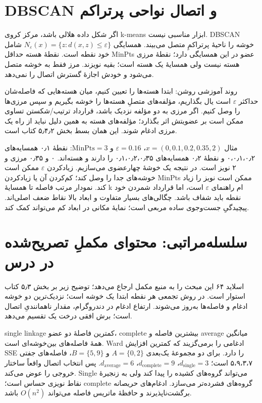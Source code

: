 \section{DBSCAN و اتصال نواحی پرتراکم}

اگر شکل داده هلالی باشد، مرکز کروی k-means ابزار مناسبی نیست. DBSCAN خوشه را ناحیهٔ پرتراکمِ متصل می‌بیند. همسایگی \(N_\varepsilon(x)=\{z:d(x,z)\le\varepsilon\}\) شامل خود نقطه است. نقطهٔ هسته حداقل MinPts عضو در این همسایگی دارد؛ نقطهٔ مرزی هسته نیست ولی همسایهٔ یک هسته است؛ بقیه نویزند. مرز فقط به خوشه متصل می‌شود و خودش اجازهٔ گسترش اتصال را نمی‌دهد.

روند آموزشی روشن: ابتدا هسته‌ها را تعیین کنیم، میان هسته‌هایی که فاصله‌شان حداکثر $\varepsilon$ است یال بگذاریم، مؤلفه‌های متصلِ هسته‌ها را خوشه بگیریم و سپس مرزی‌ها را وصل کنیم. اگر مرزی به دو مؤلفه نزدیک باشد، قرارداد ترتیب/شکستن تساوی ممکن است بر عضویتش اثر بگذارد؛ مؤلفه‌های هسته به همین دلیل نباید از راه یک مرزی ادغام شوند. این همان بسط بخش ۵٫۴٫۲ کتاب است.

مثال \(x=(0,0.1,0.2,0.35,2)\)، $\varepsilon=0.16$ و $\mathrm{MinPts}=3$: نقطهٔ ۰٫۱ همسایه‌های ۰،۰٫۱،۰٫۲ و نقطهٔ ۰٫۲ همسایه‌های ۰٫۱،۰٫۲،۰٫۳۵ را دارند و هسته‌اند. ۰ و ۰٫۳۵ مرزی و ۲ نویز است. در نتیجه یک خوشهٔ چهارعضوی می‌سازیم. زیادکردن $\varepsilon$ ممکن است خوشه‌های جدا را وصل کند؛ کم‌کردن آن یا زیادکردن MinPts ممکن است نویز را زیاد کند. نمودار مرتب فاصله تا همسایهٔ k ام راهنمای $\varepsilon$ است، اما قرارداد شمردن خود نقطه باید شفاف باشد. چگالی‌های بسیار متفاوت و ابعاد بالا نقاط ضعف اصلی‌اند. پیچیدگیِ جست‌وجوی ساده مربعی است؛ نمایهٔ مکانی در ابعاد کم می‌تواند کمک کند.

\section{سلسله‌مراتبی: محتوای مکملِ تصریح‌شده در درس}

اسلاید ۶۴ این مبحث را به منبع مکمل ارجاع می‌دهد؛ توضیح زیر بر بخش ۵٫۳ کتاب استوار است. در روش تجمعی هر نقطه ابتدا یک خوشه است؛ نزدیک‌ترین دو خوشه ادغام و فاصله‌ها به‌روز می‌شوند. ارتفاع ادغام در دندروگرام، مقدار ناهمانندیِ اتصال است؛ برش افقی درخت یک تقسیم می‌دهد.

single linkage کمترین فاصلهٔ دو عضو، complete بیشترین فاصله و average میانگین همهٔ فاصله‌های بین‌خوشه‌ای است. Ward ادغامی را برمی‌گزیند که کمترین افزایش SSE را دارد. برای دو مجموعهٔ یک‌بعدی $A=\{0,2\}$ و $B=\{5,9\}$، فاصله‌های جفتی ۵،۹،۳،۷ است؛ $d_{\mathrm{single}}=3$، $d_{\mathrm{complete}}=9$، $d_{\mathrm{average}}=6$. پس انتخاب اتصال واقعاً ساختار خروجی را عوض می‌کند. Single می‌تواند گروه‌های کشیده را پیدا کند ولی به زنجیرهٔ نقاط نویزی حساس است؛ complete گروه‌های فشرده‌تر می‌سازد. ادغام‌های حریصانه برگشت‌ناپذیرند و حافظهٔ ماتریس فاصله می‌تواند \(O(n^2)\) باشد.

